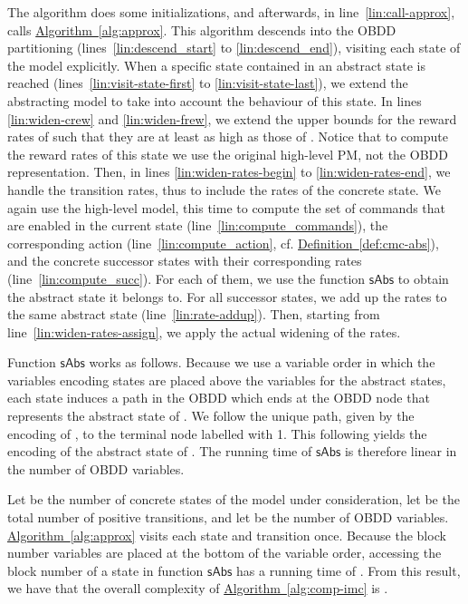 \documentclass[10pt,twocolumn]{article}
\newcommand{\fctcall}[1]{\ensuremath{\mathsf{#1}}}
\newcommand{\refdef}[1]{\texorpdfstring{\hyperref[def:#1]{Definition~\ref*{def:#1}}}{Definition \ref*{def:#1}}}
\newcommand{\refalg}[1]{\texorpdfstring{\hyperref[alg:#1]{Algorithm~\ref*{alg:#1}}}{Algorithm~\ref*{alg:#1}}}
\begin{document}
The algorithm does some initializations, and afterwards, in line~\ref{lin:call-approx}, calls
\refalg{approx}. This algorithm descends into
the OBDD partitioning (lines~\ref{lin:descend_start} to \ref{lin:descend_end}), visiting each state of the model
explicitly. When a specific state  contained in an abstract
state  is reached (lines~\ref{lin:visit-state-first} to
\ref{lin:visit-state-last}), we extend the abstracting model to take
into account the behaviour of this state. In lines
\ref{lin:widen-crew} and \ref{lin:widen-frew}, we extend the upper
bounds for the reward rates of  such that they are at least
as high as those of . Notice that to compute the reward rates
of this state we use the original high-level PM, not the OBDD
representation. Then, in lines \ref{lin:widen-rates-begin} to
\ref{lin:widen-rates-end}, we handle the transition rates, thus to
include the rates of the concrete state. We again use the high-level
model, this time to compute the set of commands that are enabled in the current state
(line~\ref{lin:compute_commands}), the corresponding action
 (line~\ref{lin:compute_action}, cf. \refdef{cmc-abs}), and the concrete successor states
with their corresponding rates (line~\ref{lin:compute_succ}). For each
of them, we use the function \fctcall{sAbs} to obtain the abstract state 
it belongs to. 
For all successor states, we add up the
rates to the same abstract state (line~\ref{lin:rate-addup}).
Then, starting from line~\ref{lin:widen-rates-assign},
we apply the actual widening of the rates.

Function \fctcall{sAbs} works as follows. Because we use a variable
order in which the variables encoding states are placed above the
variables for the abstract states, each state 
induces a path in the OBDD  which ends at the OBDD node
that represents the abstract state of . We follow the unique
path, given by the encoding of , to the terminal node labelled with
1. This following yields the encoding of the abstract state of . The running time
of \fctcall{sAbs} is therefore linear in the number of OBDD variables.

Let  be the number of concrete states of the model
under consideration, let  be the total number of positive
transitions, and let  be the number of OBDD variables.
\refalg{approx} visits each state and transition once. Because the block
number variables are placed at the bottom of the variable order,
accessing the block number of a state in  function \fctcall{sAbs}
has a running time of . From this result, we
have that the overall complexity of \refalg{comp-imc} is
.
\end{document}
